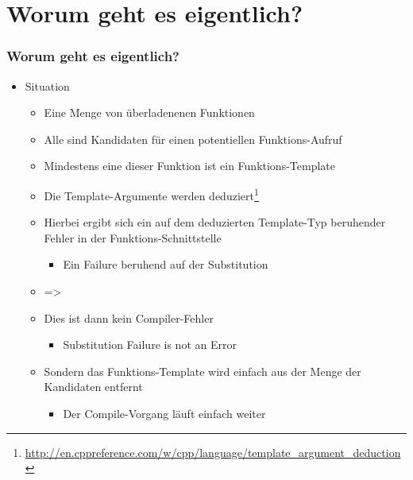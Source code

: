 \documentclass{beamer}
\begin{document}
\section{Worum geht es eigentlich?} 
\begin{frame}
\frametitle{Worum geht es eigentlich?}
\begin{itemize}
\item Situation

\begin{itemize}
\item Eine Menge von überladenenen Funktionen
\item Alle sind Kandidaten für einen potentiellen Funktions-Aufruf
\item Mindestens eine dieser Funktion ist ein Funktions-Template
\item Die Template-Argumente werden deduziert\footnote{\url{http://en.cppreference.com/w/cpp/language/template_argument_deduction}}
\item Hierbei ergibt sich ein auf dem deduzierten Template-Typ beruhender Fehler in der Funktions-Schnittstelle
\begin{itemize}
\item Ein \glqq{}Failure\grqq{} beruhend auf der \glqq{}Substitution\grqq
\end{itemize}
\end{itemize}

\begin{itemize}
\item =>
\item Dies ist dann kein Compiler-Fehler
\begin{itemize}
\item Substitution Failure is not an Error
\end{itemize}

\item Sondern das Funktions-Template wird einfach aus der Menge der Kandidaten entfernt
\begin{itemize}
\item Der Compile-Vorgang läuft einfach weiter
\end{itemize}

\end{itemize} 
\end{itemize} 
\end{frame}
\end{document}
